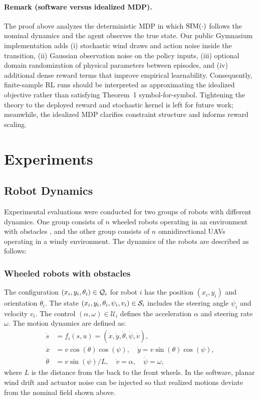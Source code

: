 \documentclass{article}
\begin{document}
\paragraph*{Remark (software versus idealized MDP).}
The proof above analyzes the deterministic MDP in which $\operatorname{SIM}(\cdot)$ follows the nominal dynamics and the agent observes the true state. Our public Gymnasium implementation adds (i) stochastic wind draws and action noise inside the transition, (ii) Gaussian observation noise on the policy inputs, (iii) optional domain randomization of physical parameters between episodes, and (iv) additional dense reward terms that improve empirical learnability. Consequently, finite-sample RL runs should be interpreted as approximating the idealized objective rather than satisfying Theorem~1 symbol-for-symbol. Tightening the theory to the deployed reward and stochastic kernel is left for future work; meanwhile, the idealized MDP clarifies constraint structure and informs reward scaling.

\section{Experiments}
\label{sec:experiments}
\subsection{Robot Dynamics}
Experimental evaluations were conducted for two groups of robots with different dynamics. One group consists of $n$ wheeled robots operating in an environment with obstacles \citep{plaku2021}, and the other group consists of $n$ omnidirectional UAVs operating in a windy environment. The dynamics of the robots are described as follows:
\subsubsection{Wheeled robots with obstacles}  The configuration $(x_i,y_i,\theta_i) \in \mathcal{Q}_i$ for robot $i$ has the position $(x_i,y_i)$ and orientation $\theta_i$. The state $(x_i,y_i,\theta_i,\psi_i,v_i) \in \mathcal{S}_i$ includes the steering angle $\psi_i$ and velocity $v_i$. The control $(\alpha, \omega) \in \mathcal{U}_i$ defines the acceleration $\alpha$ and steering rate $\omega$. The motion dynamics are defined as:
\begin{align}
\dot{s} &= f_i(s,u) = (\dot{x}, \dot{y}, \dot{\theta}, \dot{\psi}, \dot{v}), \\
\dot{x} &= v \cos(\theta) \cos(\psi), \quad \dot{y} = v \sin(\theta) \cos(\psi), \\
\dot{\theta} &= v \sin(\psi) / L, \quad  \dot{v} = \alpha, \quad \dot{\psi} = \omega,
\end{align}
where $L$ is the distance from the back to the front wheels. In the software, planar wind drift and actuator noise can be injected so that realized motions deviate from the nominal field shown above.
\end{document}
